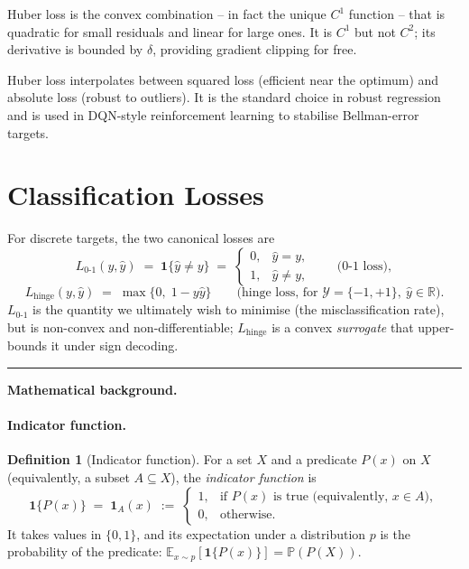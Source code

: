 \documentclass[11pt]{article}
\theoremstyle{definition}
\newtheorem{definition}{Definition}
\begin{document}
\begin{mathnote}
Huber loss is the convex combination -- in fact the unique $C^{1}$ function
-- that is quadratic for small residuals and linear for large ones. It is
$C^{1}$ but not $C^{2}$; its derivative is bounded by $\delta$, providing
gradient clipping for free.
\end{mathnote}

\begin{mlnote}
Huber loss interpolates between squared loss (efficient near the optimum)
and absolute loss (robust to outliers). It is the standard choice in
robust regression and is used in DQN-style reinforcement learning to
stabilise Bellman-error targets.
\end{mlnote}

\section{Classification Losses}

For discrete targets, the two canonical losses are
\[
  L_{0\text{-}1}(y, \hat y) \;=\; \mathbf{1}\{\hat y \neq y\}
  \;=\; \begin{cases} 0, & \hat y = y,\\ 1, & \hat y \neq y, \end{cases}
  \qquad \text{(0-1 loss)},
\]
\[
  L_{\mathrm{hinge}}(y, \hat y) \;=\; \max\{0,\; 1 - y\hat y\}
  \qquad \text{(hinge loss, for } \mathcal{Y} = \{-1, +1\},\ \hat y \in \mathbb{R}\text{)}.
\]
$L_{0\text{-}1}$ is the quantity we ultimately wish to minimise (the
misclassification rate), but is non-convex and non-differentiable;
$L_{\mathrm{hinge}}$ is a convex \emph{surrogate} that upper-bounds it under
sign decoding.

\bigskip
\hrule
\bigskip

\noindent\textbf{Mathematical background.}

\paragraph{Indicator function.}

\begin{definition}[Indicator function]
For a set $X$ and a predicate $P(x)$ on $X$ (equivalently, a subset
$A \subseteq X$), the \emph{indicator function} is
\[
  \mathbf{1}\{P(x)\} \;=\; \mathbf{1}_{A}(x) \;:=\;
  \begin{cases} 1, & \text{if } P(x) \text{ is true (equivalently, } x \in A), \\
                0, & \text{otherwise.} \end{cases}
\]
It takes values in $\{0, 1\}$, and its expectation under a distribution $p$
is the probability of the predicate:
$\mathbb{E}_{x \sim p}[\mathbf{1}\{P(x)\}] = \mathbb{P}(P(X))$.
\end{definition}
\end{document}
